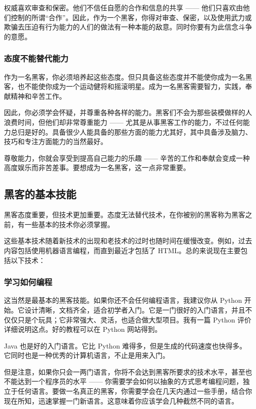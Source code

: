 权威喜欢审查和保密。他们不信任自愿的合作和信息的共享 —— 他们只喜欢由他们控制的所谓“合作”。因此，作为一个黑客，你得对审查、保密，以及使用武力或欺骗去压迫有行为能力的人们的做法有一种本能的敌意。同时你要有为此信念斗争的意愿。


\subsubsection{态度不能替代能力}
作为一名黑客，你必须培养起这些态度。但只具备这些态度并不能使你成为一名黑客，也不能使你成为一个运动健将和摇滚明星。成为一名黑客需要智力，实践，奉献精神和辛苦工作。

因此，你必须学会怀疑，并尊重各种各样的能力。黑客们不会为那些装模做样的人浪费时间，但他们却非常尊重能力 —— 尤其是从事黑客工作的能力，不过任何能力总归是好的。具备很少人能具备的那些方面的能力尤其好，其中具备涉及脑力、技巧和专注方面能力的当然最好。

尊敬能力，你就会享受到提高自己能力的乐趣 —— 辛苦的工作和奉献会变成一种高度娱乐而非苦差事。要想成为一名黑客，这一点非常重要。


\subsection{黑客的基本技能}
黑客态度重要，但技术更加重要。态度无法替代技术，在你被别的黑客称为黑客之前，有一些基本的技术你必须掌握。

这些基本技术随着新技术的出现和老技术的过时也随时间在缓慢改变。例如，过去内容包括使用机器语言编程，而直到最近才包括了 HTML。总的来说现在主要包括以下技术：


\subsubsection{学习如何编程}
这当然是最基本的黑客技能。如果你还不会任何编程语言，我建议你从 Python 开始。它设计清晰，文档齐全，适合初学者入门。它是一门很好的入门语言，并且不仅仅只是个玩具；它非常强大、灵活，也适合做大型项目。我有一篇 Python 评价详细说明这点。好的教程可以在 Python 网站得到。

Java 也是好的入门语言。它比 Python 难得多，但是生成的代码速度也快得多。它同时也是一种优秀的计算机语言，不止是用来入门。

但是注意，如果你只会一两门语言，你将不会达到黑客所要求的技术水平，甚至也不能达到一个程序员的水平 —— 你需要学会如何以抽象的方式思考编程问题，独立于任何语言。要做一名真正的黑客，你需要学会在几天内通过一些手册，结合你现在所知，迅速掌握一门新语言。这意味着你应该学会几种截然不同的语言。


